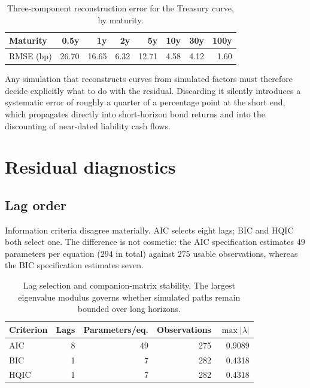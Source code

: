\documentclass[11pt,a4paper]{article}
\begin{document}
\begin{table}[htbp]
\centering
\caption{Three-component reconstruction error for the Treasury curve, by maturity.}
\label{tab:recon}
\begin{tabular}{lrrrrrrr}
\toprule
Maturity & 0.5y & 1y & 2y & 5y & 10y & 30y & 100y \\
\midrule
RMSE (bp) & 26.70 & 16.65 & 6.32 & 12.71 & 4.58 & 4.12 & 1.60 \\
\bottomrule
\end{tabular}
\end{table}

Any simulation that reconstructs curves from simulated factors must therefore
decide explicitly what to do with the residual. Discarding it silently
introduces a systematic error of roughly a quarter of a percentage point at the
short end, which propagates directly into short-horizon bond returns and into
the discounting of near-dated liability cash flows.

\section{Residual diagnostics}
\label{sec:resid}

\subsection{Lag order}

Information criteria disagree materially. AIC selects eight lags; BIC and HQIC
both select one. The difference is not cosmetic: the AIC specification estimates
$49$ parameters per equation ($294$ in total) against $275$ usable observations,
whereas the BIC specification estimates seven.

\begin{table}[htbp]
\centering
\caption{Lag selection and companion-matrix stability. The largest eigenvalue
modulus governs whether simulated paths remain bounded over long horizons.}
\label{tab:lags}
\begin{tabular}{lrrrr}
\toprule
Criterion & Lags & Parameters/eq. & Observations & $\max|\lambda|$ \\
\midrule
AIC        & 8 & 49 & 275 & 0.9089 \\
BIC        & 1 &  7 & 282 & 0.4318 \\
HQIC       & 1 &  7 & 282 & 0.4318 \\
\bottomrule
\end{tabular}
\end{table}
\end{document}
